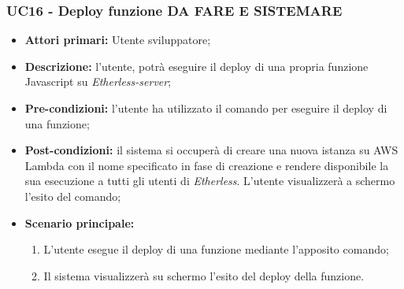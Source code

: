 \subsubsection{UC16 - Deploy funzione DA FARE E SISTEMARE}
\begin{itemize}
	\item \textbf{Attori primari:} Utente sviluppatore;
	\item \textbf{Descrizione:} l'utente, potrà eseguire il deploy di una propria funzione Javascript su \textit{Etherless-server}; 
	\item \textbf{Pre-condizioni:} l'utente ha utilizzato il comando per eseguire il deploy di una funzione;
	\item \textbf{Post-condizioni:} il sistema si occuperà di creare una nuova istanza su AWS Lambda con il nome specificato in fase di creazione e rendere disponibile la sua esecuzione a tutti gli utenti di \textit{Etherless}. L'utente visualizzerà a schermo l'esito del comando;
	\item \textbf{Scenario principale:} 
	\begin{enumerate}
		\item L'utente esegue il deploy di una funzione mediante l'apposito comando;
		\item Il sistema visualizzerà su schermo l'esito del deploy della funzione.
	\end{enumerate}
\end{itemize}